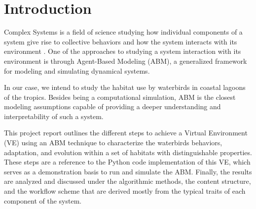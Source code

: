 %
%
%
%


\section{Introduction}
Complex Systems is a field of science studying how individual components of a system give rise to collective behaviors and how the system interacts with its environment \cite{ago2019abm}. One of the approaches to studying a system interaction with its environment is through Agent-Based Modeling (ABM), a generalized framework for modeling and simulating dynamical systems.

In our case, we intend to study the habitat use by waterbirds in coastal lagoons of the tropics. Besides being a computational simulation, ABM is the closest modeling assumptions capable of providing a deeper understanding and interpretability of such a system.

This project report outlines the different steps to achieve a Virtual Environment (VE) using an ABM technique to characterize the waterbirds behaviors, adaptation, and evolution within a set of habitats with distinguishable properties. These steps are a reference to the Python code implementation of this VE, which serves as a demonstration basis to run and simulate the ABM. Finally, the results are analyzed and discussed under the algorithmic methods, the content structure, and the workflow scheme that are derived mostly from the typical traits of each component of the system.

